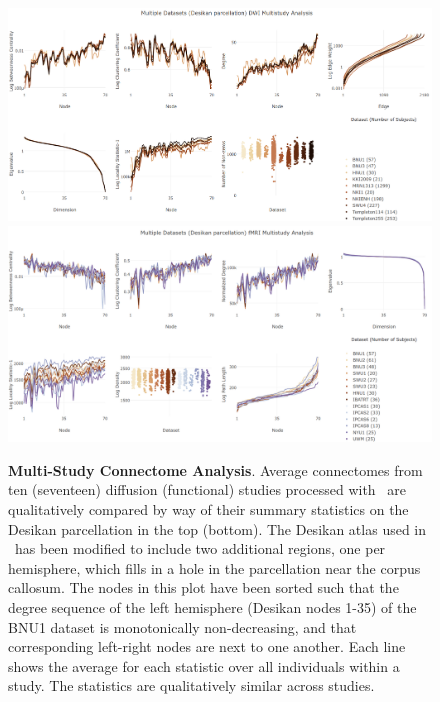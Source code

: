 \documentclass[11pt]{article}
\begin{document}
\begin{figure}[t!]
    \centering
    \includegraphics[width=\textwidth]{./figs/fig_dwi_multisite.png}
    \includegraphics[width=\textwidth]{./figs/fig_fmri_multisite.png}
    \caption{
    \textbf{Multi-Study Connectome Analysis}.
    Average connectomes from ten (seventeen) diffusion (functional) studies processed with \ndmgd~are qualitatively compared by way of their summary statistics on the Desikan parcellation in the top (bottom).
    The Desikan atlas used in \ndmg~has been modified to include two additional regions, one per hemisphere, which fills in a hole in the parcellation near the corpus callosum.
    The nodes in this plot have been sorted such that the degree sequence of the left hemisphere (Desikan nodes 1-35) of the BNU1 dataset is monotonically non-decreasing, and that corresponding left-right nodes are next to one another.
    Each line shows the average for each statistic over all individuals within a study.
    The statistics are  qualitatively similar across studies. 
    }
    \label{fig:multisite}
\end{figure}
\end{document}
